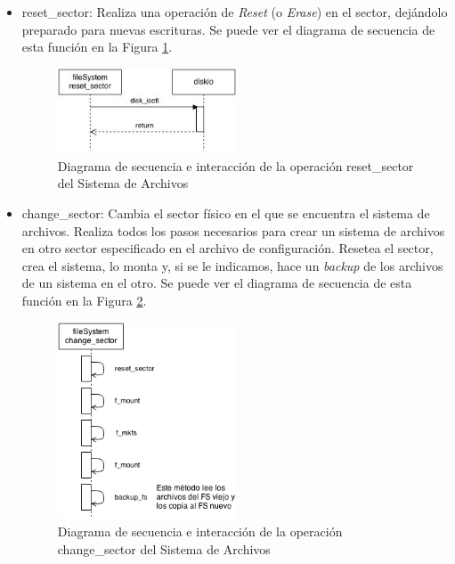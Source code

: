 \begin{itemize}
\item reset\_sector: Realiza una operación de \textit{Reset} (o \textit{Erase}) en el sector, dejándolo preparado para nuevas escrituras. Se puede ver el diagrama de secuencia de esta función en la Figura \ref{fig:resetsector}.

\begin{figure}[!h]
\begin{center}
\includegraphics[width=0.5\textwidth]{figs/resetsector.png}
\caption{Diagrama de secuencia e interacción de la operación reset\_sector del Sistema de Archivos}
\label{fig:resetsector}
\end{center}
\end{figure}

\item change\_sector: Cambia el sector físico en el que se encuentra el sistema de archivos. Realiza todos los pasos necesarios para crear un sistema de archivos en otro sector especificado en el archivo de configuración. Resetea el sector, crea el sistema, lo monta y, si se le indicamos, hace un \textit{backup} de los archivos de un sistema en el otro. Se puede ver el diagrama de secuencia de esta función en la Figura \ref{fig:changesector}.\\

\begin{figure}[!h]
\begin{center}
\includegraphics[width=0.5\textwidth]{figs/changesector.png}
\caption{Diagrama de secuencia e interacción de la operación change\_sector del Sistema de Archivos}
\label{fig:changesector}
\end{center}
\end{figure}


\end{itemize}

